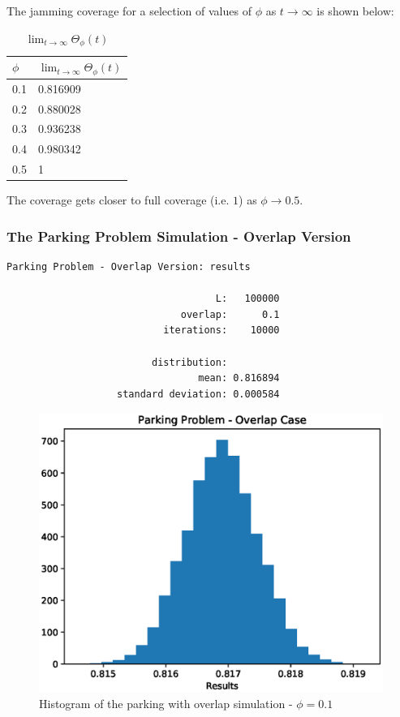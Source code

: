\documentclass{beamer}
\begin{document}
\begin{frame}
    The jamming coverage for a selection of values of $\phi$ 
    as $t \to \infty$ is shown below:
    \begin{table}
    	\centering
    	\begin{tabular}{|l | l|} 
    		\hline
    		$\phi$ & $\lim_{t \to \infty} \Theta_{\phi}(t)$ \\ [1ex] 
    		\hline
    		0.1 & 0.816909 \\ 
    		0.2 & 0.880028 \\ 
    		0.3 & 0.936238 \\ 
    		0.4 & 0.980342 \\ 
    		0.5 & 1 \\ 
    		\hline
    	\end{tabular}
    	\caption{$\lim_{t \to \infty} \Theta_{\phi}(t)$}
    	\label{table:2}
    \end{table}
    The coverage gets closer to full coverage (i.e. $1$) as $\phi \to 0.5$. \bigskip
\end{frame}

\begin{frame}[fragile]
    \frametitle{The Parking Problem Simulation - Overlap Version}
	\begin{lstlisting}[numbers=none]
    Parking Problem - Overlap Version: results

                                    L:   100000
                              overlap:      0.1
                           iterations:    10000

                         distribution:
                                 mean: 0.816894
                   standard deviation: 0.000584

	\end{lstlisting}
\end{frame}

\begin{frame}
    \begin{figure}
    	\centering
    	\includegraphics[scale = 0.5]{parking_simulation_03.eps}
    	\caption{Histogram of the parking with overlap simulation - $\phi = 0.1$}
    \end{figure}
\end{frame}
\end{document}
